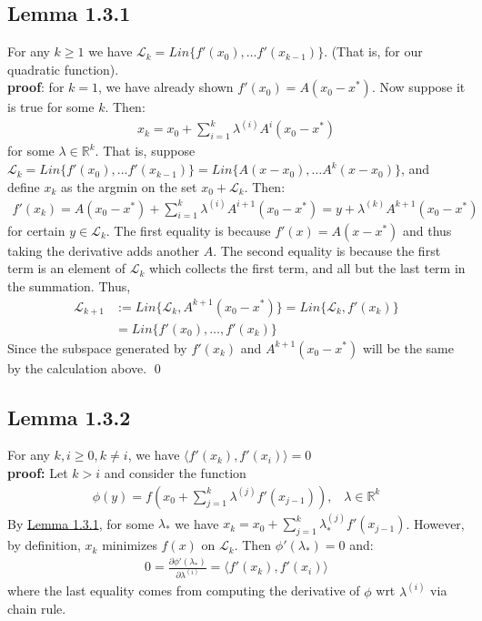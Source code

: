 \documentclass[12pt,a4paper]{article}
\begin{document}
	\subsection*{Lemma 1.3.1}\label{lem131}
	For any $k \geq 1$ we have $\mathcal{L}_k = Lin \{f'(x_0), \ldots f'(x_{k-1})\}$. (That is, for our quadratic function). \\
	\textbf{proof}: for $k=1$, we have already shown $f'(x_0) = A(x_0 - x^*)$. Now suppose it is true for some $k$. Then:
	\begin{align*}
		x_k = x_0 + \sum_{i=1}^{k}\lambda^{(i)}A^i(x_0 - x^*)
	\end{align*}
	for some $\lambda \in \mathbb{R}^k$. That is, suppose $\mathcal{L}_k = Lin \{f'(x_0), \ldots f'(x_{k-1})\} = Lin \{A(x - x_0), \ldots A^k (x - x_0) \}$, and define $x_k$ as the argmin on the set $x_0 + \mathcal{L}_k$. Then:
	\begin{align*}
		f'(x_k) = A(x_0 - x^*) + \sum_{i=1}^{k}\lambda^{(i)}A^{i+1}(x_0 - x^*) = y + \lambda^{(k)}A^{k+1}(x_0 - x^*)
	\end{align*}
	for certain $y \in \mathcal{L}_k$. The first equality is because $f'(x) = A(x - x^*)$ and thus taking the derivative adds another $A$. The second equality is because the first term is an element of $\mathcal{L}_k$ which collects the first term, and all but the last term in the summation. Thus, 
	\begin{align*}
		\mathcal{L}_{k+1} &:= Lin \{\mathcal{L}_k, A^{k+1}(x_0 - x^*)\} = Lin \{\mathcal{L}_k, f'(x_k)\} \\
		&= Lin \{f'(x_0), \ldots , f'(x_k)\}
	\end{align*}
	Since the subspace generated by $f'(x_k)$ and $A^{k+1}(x_0 - x^*)$ will be the same by the calculation above. 
	\qed
	\subsection*{Lemma 1.3.2}\label{lem132}
	For any $k, i \geq 0, k \neq i$, we have $\langle f'(x_k), f'(x_i) \rangle = 0$ \\
	\textbf{proof:} Let $k > i$ and consider the function
	\begin{align*}
		\phi(y) = f(x_0 + \sum_{j=1}^{k} \lambda^{(j)}f'(x_{j-1})), \hspace{10pt} \lambda \in \mathbb{R}^k
	\end{align*}
	By \hyperref[lem131]{Lemma 1.3.1}, for some $\lambda_*$ we have $x_k = x_0 + \sum_{j=1}^{k}\lambda_*^{(j)}f'(x_{j-1})$. However, by definition, $x_k$ minimizes $f(x)$ on $\mathcal{L}_k$. Then $\phi'(\lambda_*) = 0$ and:
	\begin{align*}
		0 = \frac{\partial \phi'(\lambda_*) }{\partial \lambda^{(i)}}= \langle f'(x_k), f'(x_i) \rangle
	\end{align*}
	where the last equality comes from computing the derivative of $\phi$ wrt $\lambda^{(i)}$ via chain rule.
	
\end{document}

